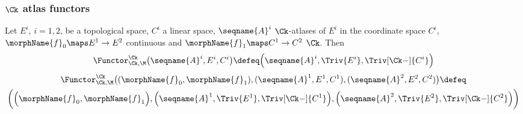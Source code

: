 \documentclass{article}
\begin{document}
\subsubsection{\ensuremath{\Ck} atlas functors}
\begin{definition}
\label{def:Func-Ck-M}
Let $E^i$, $i=1,2$, be a topological space, $C^i$ a linear space,
$\seqname{A}^i$ $\Ck$-atlases of $E^i$ in the coordinate space $C^i$,
$\morphName{f}_0 \maps E^1 \to E^2$ continuous and
$\morphName{f}_1 \maps C^1 \to C^2$ $\Ck$. Then
\begin{equation}
\Functor^\Ck_{\Ck,\M} \bigl (\seqname{A}^i, E^i, C^i \bigl )
\defeq
  \Bigl (
    \seqname{A}^i,
    \Triv{E^i},
    \Triv[\Ck-]{C^i}
  \Bigr )
\end{equation}
\begin{multline}
\Functor^\Ck_{\Ck,\M}
  \bigl (
    (
      \morphName{f}_0,
      \morphName{f}_1
    ),
    (\seqname{A}^1, E^1, C^1),
    (\seqname{A}^2, E^2, C^2)
  \bigr )
\defeq \\
  \biggl (
    \Bigl (
      \morphName{f}_0,
      \morphName{f}_1
     \Bigr ) ,
    \Bigl ( \seqname{A}^1, \Triv{E^1}, \Triv[\Ck-]{C^1} \Bigr ) ,
    \Bigl ( \seqname{A}^2, \Triv{E^2}, \Triv[\Ck-]{C^2} \Bigr )
  \biggr )
\end{multline}
\end{definition}
\end{document}
